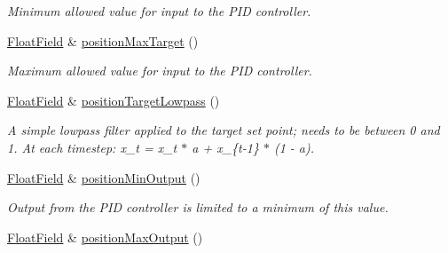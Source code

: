 \begin{DoxyCompactItemize}
\begin{DoxyCompactList}\small\item\em Minimum allowed value for input to the P\+ID controller. \end{DoxyCompactList}\item 
\hyperlink{classhebi_1_1Command_1_1FloatField}{Float\+Field} \& \hyperlink{classhebi_1_1Command_1_1Settings_1_1Actuator_1_1PositionGains_a8e1399e09db0a7b43c4539012d2ac1cb}{position\+Max\+Target} ()\hypertarget{classhebi_1_1Command_1_1Settings_1_1Actuator_1_1PositionGains_a8e1399e09db0a7b43c4539012d2ac1cb}{}\label{classhebi_1_1Command_1_1Settings_1_1Actuator_1_1PositionGains_a8e1399e09db0a7b43c4539012d2ac1cb}

\begin{DoxyCompactList}\small\item\em Maximum allowed value for input to the P\+ID controller. \end{DoxyCompactList}\item 
\hyperlink{classhebi_1_1Command_1_1FloatField}{Float\+Field} \& \hyperlink{classhebi_1_1Command_1_1Settings_1_1Actuator_1_1PositionGains_a5e5481f01ae7c708260fac42cdbea5f8}{position\+Target\+Lowpass} ()\hypertarget{classhebi_1_1Command_1_1Settings_1_1Actuator_1_1PositionGains_a5e5481f01ae7c708260fac42cdbea5f8}{}\label{classhebi_1_1Command_1_1Settings_1_1Actuator_1_1PositionGains_a5e5481f01ae7c708260fac42cdbea5f8}

\begin{DoxyCompactList}\small\item\em A simple lowpass filter applied to the target set point; needs to be between 0 and 1. At each timestep\+: x\+\_\+t = x\+\_\+t $\ast$ a + x\+\_\+\{t-\/1\} $\ast$ (1 -\/ a). \end{DoxyCompactList}\item 
\hyperlink{classhebi_1_1Command_1_1FloatField}{Float\+Field} \& \hyperlink{classhebi_1_1Command_1_1Settings_1_1Actuator_1_1PositionGains_a2e0e7d2968222f3274043a315e0eca09}{position\+Min\+Output} ()\hypertarget{classhebi_1_1Command_1_1Settings_1_1Actuator_1_1PositionGains_a2e0e7d2968222f3274043a315e0eca09}{}\label{classhebi_1_1Command_1_1Settings_1_1Actuator_1_1PositionGains_a2e0e7d2968222f3274043a315e0eca09}

\begin{DoxyCompactList}\small\item\em Output from the P\+ID controller is limited to a minimum of this value. \end{DoxyCompactList}\item 
\hyperlink{classhebi_1_1Command_1_1FloatField}{Float\+Field} \& \hyperlink{classhebi_1_1Command_1_1Settings_1_1Actuator_1_1PositionGains_aa828cf2cab9c16748ccbbdb201de1719}{position\+Max\+Output} ()\hypertarget{classhebi_1_1Command_1_1Settings_1_1Actuator_1_1PositionGains_aa828cf2cab9c16748ccbbdb201de1719}{}\label{classhebi_1_1Command_1_1Settings_1_1Actuator_1_1PositionGains_aa828cf2cab9c16748ccbbdb201de1719}


\end{DoxyCompactItemize}
